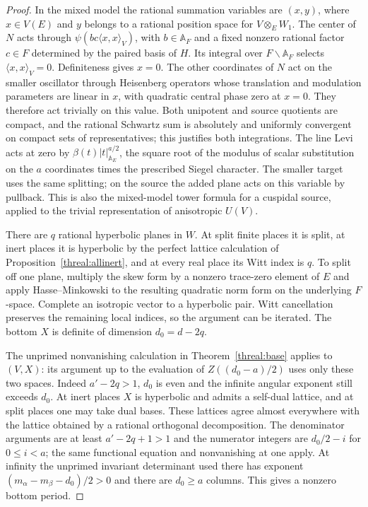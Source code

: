 \begin{proof}
In the mixed model the rational summation variables are \((x,y)\),
where \(x\in V(E)\) and \(y\) belongs to a rational position space
for \(V\otimes_E W_1\). The center of \(N\) acts through
\(\psi(bc\langle x,x\rangle_V)\), with \(b\in\mathbb A_F\) and
a fixed nonzero rational factor \(c\in F\) determined by the paired
basis of \(H\). Its integral over \(F\backslash\mathbb A_F\) selects
\(\langle x,x\rangle_V=0\). Definiteness gives \(x=0\).
The other coordinates of \(N\) act on the smaller oscillator through
Heisenberg operators whose translation and modulation parameters are
linear in \(x\), with quadratic central phase zero at \(x=0\).
They therefore act trivially on this value. Both unipotent and source
quotients are compact, and the rational Schwartz sum is absolutely
and uniformly convergent on compact sets of representatives; this
justifies both integrations. The line Levi acts at zero by
\(\beta(t)|t|_{\mathbb A_E}^{a/2}\), the square root of the modulus
of scalar substitution on the \(a\) coordinates times the prescribed
Siegel character. The smaller target uses the same splitting; on the
source the added plane acts on this variable by pullback. This is
also the mixed-model tower formula for a cuspidal source, applied to
the trivial representation of anisotropic \(U(V)\).
\cite[Proposition~3.1, (3.2)--(3.4)]{wuThetaTower}

There are \(q\) rational hyperbolic planes in \(W\). At split finite
places it is split, at inert places it is hyperbolic by the perfect
lattice calculation of Proposition~\ref{threal:allinert}, and at
every real place its Witt index is \(q\). To split off one plane,
multiply the skew form by a nonzero trace-zero element of \(E\) and
apply Hasse--Minkowski to the resulting quadratic norm form on the
underlying \(F\)-space. Complete an isotropic vector to a hyperbolic
pair. Witt cancellation preserves the remaining local indices, so
the argument can be iterated. The bottom \(X\) is definite of
dimension \(d_0=d-2q\).

The unprimed nonvanishing calculation in Theorem~\ref{threal:base}
applies to \((V,X)\): its argument up to the evaluation of
\(Z((d_0-a)/2)\) uses only these two spaces. Indeed
\(a'-2q>1\), \(d_0\) is even and the infinite angular exponent still
exceeds \(d_0\). At inert places \(X\) is hyperbolic and admits a
self-dual lattice, and at split places one may take dual bases.
These lattices agree almost everywhere with the lattice obtained by
a rational orthogonal decomposition. The denominator arguments
are at least \(a'-2q+1>1\) and the numerator integers are
\(d_0/2-i\) for \(0\leq i<a\); the same functional equation and
nonvanishing at one apply. At infinity the unprimed invariant
determinant used there has exponent \((m_\alpha-m_\beta-d_0)/2>0\)
and there are \(d_0\geq a\) columns. This gives a nonzero bottom
period.


\end{proof}
